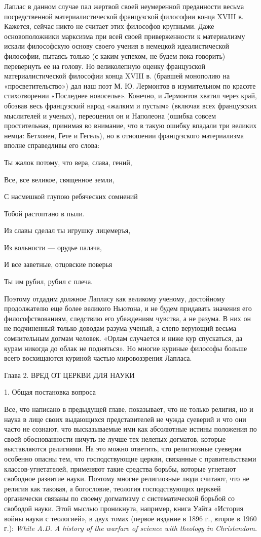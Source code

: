 Лаплас в данном случае пал жертвой своей неумеренной преданности весьма
посредственной материалистической французской философии конца XVIII в.
Кажется, сейчас никто не считает этих философов крупными. Даже
основоположники марксизма при всей своей приверженности к материализму
искали философскую основу своего учения в немецкой идеалистической
философии, пытаясь только (с каким успехом, не будем пока говорить)
перевернуть ее на голову. Но великолепную оценку французской
материалистической философии конца XVIII в. (бравшей монополию на
«просветительство») дал наш поэт М. Ю. Лермонтов в изумительном по красоте
стихотворении «Последнее новоселье». Конечно, и Лермонтов хватил через
край, обозвав весь французский народ «жалким и пустым» (включая всех
французских мыслителей и ученых), переоценил он и Наполеона (ошибка совсем
простительная, принимая во внимание, что в такую ошибку впадали три великих
немца: Бетховен, Гете и Гегель), но в отношении французского материализма
вполне справедливы его слова:

Ты жалок потому, что вера, слава, гений,

Все, все великое, священное земли,

С насмешкой глупою ребяческих сомнений

Тобой растоптано в пыли.

Из славы сделал ты игрушку лицемеръя,

Из вольности --- орудье палача,

И все заветные, отцовские поверья

Ты им рубил, рубил с плеча.

Поэтому отдадим должное Лапласу как великому ученому, достойному
продолжателю еще более великого Ньютона, и не будем придавать значения его
философствованиям, следствию его убеждениям чувства,
а не разума. В них он не подчиненный только доводам разума ученый, а слепо
верующий весьма сомнительным догмам человек. «Орлам случается и ниже кур
спускаться, да курам никогда до облак не подняться». Но многие куриные
философы больше всего восхищаются куриной частью мировоззрения Лапласа.

Глава 2. ВРЕД ОТ ЦЕРКВИ ДЛЯ НАУКИ

1. Общая постановка вопроса

Все, что написано в предыдущей главе, показывает, что не только религия, но и
наука в лице своих выдающихся представителей не чужда суеверий и что они часто
не сознают, что высказываемые ими как абсолютные истины положения по своей
обоснованности ничуть не лучше тех нелепых догматов, которые выставляются
религиями. На это можно ответить, что религиозные суеверия особенно опасны тем,
что господствующие церкви, связанные с правительствами классов-угнетателей,
применяют такие средства борьбы, которые угнетают свободное развитие науки.
Поэтому многие религиозные люди считают, что не религия как таковая, а
богословие, теология господствующих церквей органически связаны по своему
догматизму с систематической борьбой со свободой науки. Этой мыслью проникнута,
например, книга Уайта «История войны науки с теологией», в двух томах (первое
издание в 1896 г., второе в 1960 г.): \textit{White A.D. A history of the
warfare of science with theology in Christendom.}

